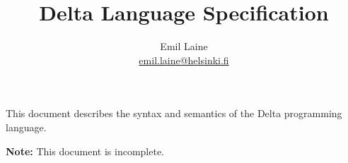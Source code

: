 \documentclass[oneside]{memoir}
\begin{document}
\title{Delta Language Specification}
\author{Emil Laine \\ \href{mailto:emil.laine@helsinki.fi}{emil.laine@helsinki.fi}}
\maketitle

This document describes the syntax and semantics of the Delta programming language.

\textbf{Note:} This document is incomplete.

\tableofcontents







\end{document}
